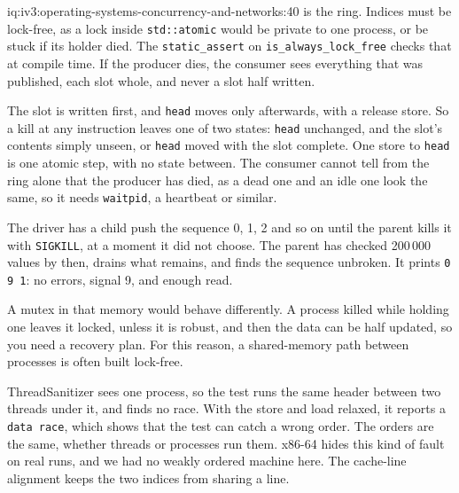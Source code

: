 \begin{solution}{iq:iv3:operating-systems-concurrency-and-networks:40}
 is the ring. Indices must be lock-free, as a lock inside \texttt{std::atomic} would be private to one process, or be stuck if its holder died. The \texttt{static\_assert} on \texttt{is\_always\_lock\_free} checks that at compile time. If the producer dies, the consumer sees everything that was published, each slot whole, and never a slot half written.
\label{lst:iv3:os:shmring}

The slot is written first, and \texttt{head} moves only afterwards, with a release store. So a kill at any instruction leaves one of two states: \texttt{head} unchanged, and the slot's contents simply unseen, or \texttt{head} moved with the slot complete. One store to \texttt{head} is one atomic step, with no state between. The consumer cannot tell from the ring alone that the producer has died, as a dead one and an idle one look the same, so it needs \texttt{waitpid}, a heartbeat or similar.

The driver has a child push the sequence 0, 1, 2 and so on until the parent kills it with \texttt{SIGKILL}, at a moment it did not choose. The parent has checked 200\,000 values by then, drains what remains, and finds the sequence unbroken. It prints \texttt{0 9 1}: no errors, signal 9, and enough read.

A mutex in that memory would behave differently. A process killed while holding one leaves it locked, unless it is robust, and then the data can be half updated, so you need a recovery plan. For this reason, a shared-memory path between processes is often built lock-free.

ThreadSanitizer sees one process, so the test runs the same header between two threads under it, and finds no race. With the store and load relaxed, it reports a \texttt{data race}, which shows that the test can catch a wrong order. The orders are the same, whether threads or processes run them. x86-64 hides this kind of fault on real runs, and we had no weakly ordered machine here. The cache-line alignment keeps the two indices from sharing a line.

\end{solution}
